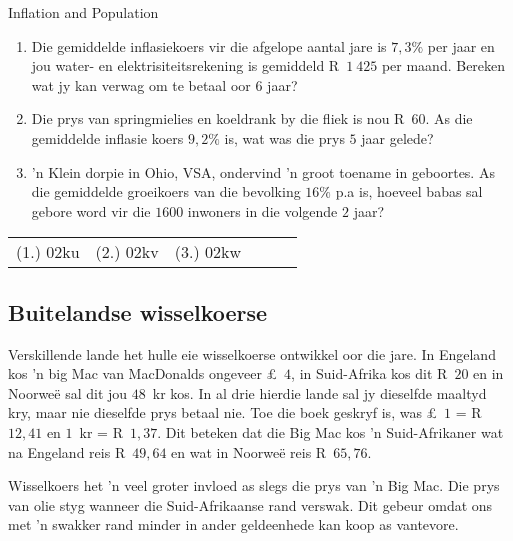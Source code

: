 \begin{exercises}{Inflation and Population}
{
    \begin{enumerate}[label=\textbf{\arabic*}.]
	\item Die gemiddelde inflasiekoers vir die afgelope aantal jare is $7,3\%$ per jaar en jou water- en elektrisiteitsrekening is gemiddeld R~$1~425$ per maand. Bereken wat jy kan verwag om te betaal oor 6 jaar?

	\item Die prys van springmielies en koeldrank by die fliek is nou R~$60$. As die gemiddelde inflasie koers $9,2\%$ is, wat was die prys $5$ jaar gelede?

	\item 'n Klein dorpie in Ohio, VSA, ondervind 'n groot toename in geboortes. As die gemiddelde groeikoers van die bevolking $16\%$ p.a is, hoeveel babas sal gebore word vir die $1600$ inwoners in die volgende $2$ jaar?
    \end{enumerate}

\par \practiceinfo
\par \begin{tabular}[h]{cccccc}
(1.)	02ku	&
(2.)	02kv	&
(3.)	02kw	&
\end{tabular}
}
\end{exercises}



\subsection{Buitelandse wisselkoerse}

Verskillende lande het hulle eie wisselkoerse ontwikkel oor die jare. In Engeland kos 'n big Mac van MacDonalds ongeveer £~$4$, in Suid-Afrika kos dit R~$20$ en in Noorwe\"e sal dit jou $48$~kr kos. In al drie hierdie lande sal jy dieselfde maaltyd kry, maar nie dieselfde prys betaal nie. Toe die boek geskryf is, was £~$1$ = R~$12,41$ en $1$~kr = R~$1,37$. Dit beteken dat die Big Mac kos 'n Suid-Afrikaner wat na Engeland reis R~$49,64$ en wat in Noorwe\"e reis R~$65,76$.\par

Wisselkoers het 'n veel groter invloed as slegs die prys van 'n Big Mac. Die prys van olie styg wanneer die Suid-Afrikaanse rand verswak. Dit gebeur omdat ons met 'n swakker rand minder in ander geldeenhede kan koop as vantevore.\par

